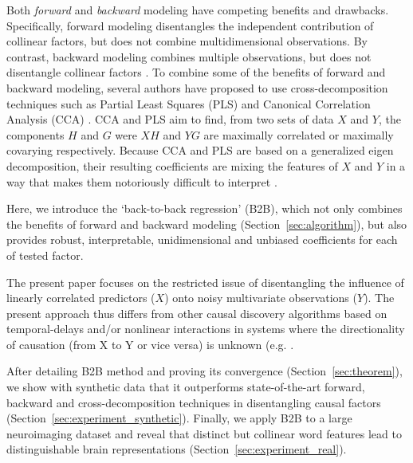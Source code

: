 Both \emph{forward} and \emph{backward} modeling have competing benefits and drawbacks.
Specifically, forward modeling disentangles the independent contribution of
collinear factors, but does not combine multidimensional observations. By
contrast, backward modeling combines multiple observations, but does not
disentangle collinear factors \citep{weichwald2015causal,
hebart2018deconstructing, king2018encoding}. To combine some of the benefits of forward
and backward modeling, several authors have proposed to use cross-decomposition
techniques such as Partial Least Squares (PLS) and Canonical Correlation
Analysis (CCA) \citep{de2019multiway}. CCA and PLS aim to find, from two sets of
data $X$ and $Y$, the components $H$ and $G$ were $XH$ and $YG$ are maximally
correlated or maximally covarying respectively. Because CCA and PLS are based on
a generalized eigen decomposition, their resulting coefficients are mixing the
features of $X$ and $Y$ in a way that makes them notoriously difficult to
interpret \citep{lebart1995statistique}.

Here, we introduce the `back-to-back regression' (B2B), which not only combines
the benefits of forward and backward modeling (Section~\ref{sec:algorithm}), but
also provides robust, interpretable, unidimensional and unbiased coefficients for
each of tested factor.

The present paper focuses on the restricted issue of disentangling the
influence of linearly correlated predictors ($X$) onto noisy multivariate
observations ($Y$). The present approach thus differs from other causal
discovery algorithms based on temporal-delays and/or nonlinear interactions in
systems where the directionality of causation (from X to Y or vice versa) is
unknown (e.g. \citep{peters2017elements, granger1969investigating,
janzing2013quantifying, scholkopf2016modeling}.

After detailing B2B method and proving its convergence
(Section~\ref{sec:theorem}), we show with synthetic data that it outperforms
state-of-the-art forward, backward and cross-decomposition techniques in
disentangling causal factors (Section~\ref{sec:experiment_synthetic}). Finally,
we apply B2B to a large neuroimaging dataset and reveal that distinct but
collinear word features lead to distinguishable brain representations
(Section~\ref{sec:experiment_real}).
